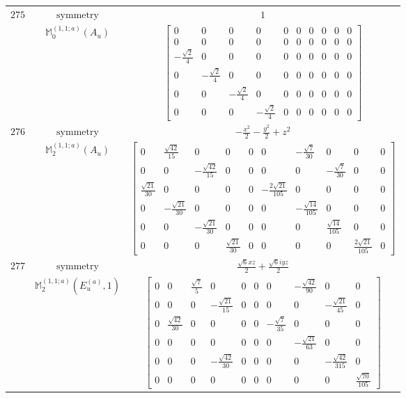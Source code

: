\documentclass[fleqn,8pt,landscape]{jsarticle}
\begin{document}
\begin{longtable}{ccc}
$ 275 $ & $ \text{symmetry} $ & $ 1 $ \\
$  $ & $ \mathbb{M}_{0}^{(1,1;a)}(A_{u}) $ & $ \begin{bmatrix} 0 & 0 & 0 & 0 & 0 & 0 & 0 & 0 & 0 & 0 \\ 0 & 0 & 0 & 0 & 0 & 0 & 0 & 0 & 0 & 0 \\ - \frac{\sqrt{2}}{4} & 0 & 0 & 0 & 0 & 0 & 0 & 0 & 0 & 0 \\ 0 & - \frac{\sqrt{2}}{4} & 0 & 0 & 0 & 0 & 0 & 0 & 0 & 0 \\ 0 & 0 & - \frac{\sqrt{2}}{4} & 0 & 0 & 0 & 0 & 0 & 0 & 0 \\ 0 & 0 & 0 & - \frac{\sqrt{2}}{4} & 0 & 0 & 0 & 0 & 0 & 0 \end{bmatrix} $ \\ \hline
$ 276 $ & $ \text{symmetry} $ & $ - \frac{x^{2}}{2} - \frac{y^{2}}{2} + z^{2} $ \\
$  $ & $ \mathbb{M}_{2}^{(1,1;a)}(A_{u}) $ & $ \begin{bmatrix} 0 & \frac{\sqrt{42}}{15} & 0 & 0 & 0 & 0 & - \frac{\sqrt{7}}{30} & 0 & 0 & 0 \\ 0 & 0 & - \frac{\sqrt{42}}{15} & 0 & 0 & 0 & 0 & - \frac{\sqrt{7}}{30} & 0 & 0 \\ \frac{\sqrt{21}}{30} & 0 & 0 & 0 & 0 & - \frac{2 \sqrt{21}}{105} & 0 & 0 & 0 & 0 \\ 0 & - \frac{\sqrt{21}}{30} & 0 & 0 & 0 & 0 & - \frac{\sqrt{14}}{105} & 0 & 0 & 0 \\ 0 & 0 & - \frac{\sqrt{21}}{30} & 0 & 0 & 0 & 0 & \frac{\sqrt{14}}{105} & 0 & 0 \\ 0 & 0 & 0 & \frac{\sqrt{21}}{30} & 0 & 0 & 0 & 0 & \frac{2 \sqrt{21}}{105} & 0 \end{bmatrix} $ \\ \hline
$ 277 $ & $ \text{symmetry} $ & $ \frac{\sqrt{6} x z}{2} + \frac{\sqrt{6} i y z}{2} $ \\
$  $ & $ \mathbb{M}_{2}^{(1,1;a)}(E_{u}^{(a)},1) $ & $ \begin{bmatrix} 0 & 0 & \frac{\sqrt{7}}{5} & 0 & 0 & 0 & 0 & - \frac{\sqrt{42}}{90} & 0 & 0 \\ 0 & 0 & 0 & - \frac{\sqrt{21}}{15} & 0 & 0 & 0 & 0 & - \frac{\sqrt{21}}{45} & 0 \\ 0 & \frac{\sqrt{42}}{30} & 0 & 0 & 0 & 0 & - \frac{\sqrt{7}}{35} & 0 & 0 & 0 \\ 0 & 0 & 0 & 0 & 0 & 0 & 0 & - \frac{\sqrt{21}}{63} & 0 & 0 \\ 0 & 0 & 0 & - \frac{\sqrt{42}}{30} & 0 & 0 & 0 & 0 & - \frac{\sqrt{42}}{315} & 0 \\ 0 & 0 & 0 & 0 & 0 & 0 & 0 & 0 & 0 & \frac{\sqrt{70}}{105} \end{bmatrix} $ \\ \hline

\end{longtable}
\end{document}
